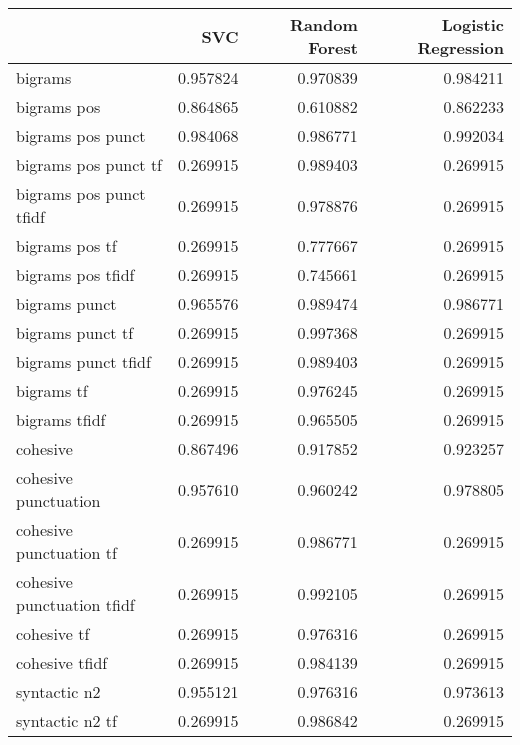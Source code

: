 \begin{tabular}{lrrr}
\toprule
{} &       SVC &  Random Forest &  Logistic Regression \\
\midrule
bigrams                    &  0.957824 &       0.970839 &             0.984211 \\
bigrams pos                &  0.864865 &       0.610882 &             0.862233 \\
bigrams pos punct          &  0.984068 &       0.986771 &             0.992034 \\
bigrams pos punct tf       &  0.269915 &       0.989403 &             0.269915 \\
bigrams pos punct tfidf    &  0.269915 &       0.978876 &             0.269915 \\
bigrams pos tf             &  0.269915 &       0.777667 &             0.269915 \\
bigrams pos tfidf          &  0.269915 &       0.745661 &             0.269915 \\
bigrams punct              &  0.965576 &       0.989474 &             0.986771 \\
bigrams punct tf           &  0.269915 &       0.997368 &             0.269915 \\
bigrams punct tfidf        &  0.269915 &       0.989403 &             0.269915 \\
bigrams tf                 &  0.269915 &       0.976245 &             0.269915 \\
bigrams tfidf              &  0.269915 &       0.965505 &             0.269915 \\
cohesive                   &  0.867496 &       0.917852 &             0.923257 \\
cohesive punctuation       &  0.957610 &       0.960242 &             0.978805 \\
cohesive punctuation tf    &  0.269915 &       0.986771 &             0.269915 \\
cohesive punctuation tfidf &  0.269915 &       0.992105 &             0.269915 \\
cohesive tf                &  0.269915 &       0.976316 &             0.269915 \\
cohesive tfidf             &  0.269915 &       0.984139 &             0.269915 \\
syntactic n2               &  0.955121 &       0.976316 &             0.973613 \\
syntactic n2 tf            &  0.269915 &       0.986842 &             0.269915 \\

\end{tabular}
